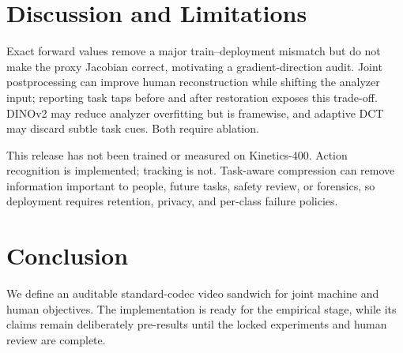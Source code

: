 \documentclass[conference]{IEEEtran}
\begin{document}
\section{Discussion and Limitations}
Exact forward values remove a major train--deployment mismatch but do not make the proxy Jacobian correct, motivating a gradient-direction audit. Joint postprocessing can improve human reconstruction while shifting the analyzer input; reporting task taps before and after restoration exposes this trade-off. DINOv2 may reduce analyzer overfitting but is framewise, and adaptive DCT may discard subtle task cues. Both require ablation.

This release has not been trained or measured on Kinetics-400. Action recognition is implemented; tracking is not. Task-aware compression can remove information important to people, future tasks, safety review, or forensics, so deployment requires retention, privacy, and per-class failure policies.

\section{Conclusion}
We define an auditable standard-codec video sandwich for joint machine and human objectives. The implementation is ready for the empirical stage, while its claims remain deliberately pre-results until the locked experiments and human review are complete.



\end{document}
